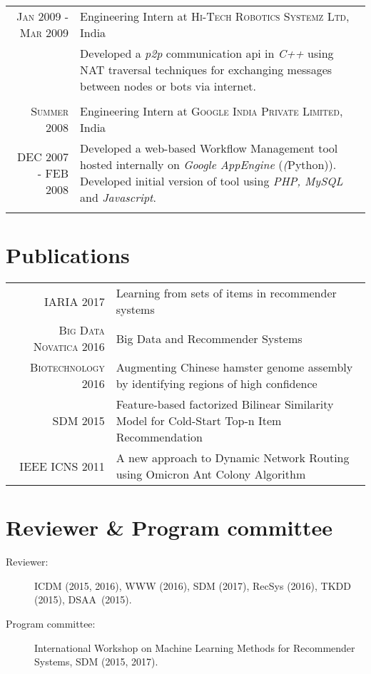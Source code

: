 \documentclass[a4paper,10pt]{article}
\begin{document}
\begin{tabular}{r|p{11cm}}
  \textsc{Jan 2009 - Mar 2009} & Engineering Intern at \textsc{Hi-Tech Robotics
                 Systemz Ltd}, India \\
                 &\footnotesize{ Developed a \emph{p2p} communication api in
                 \emph{C++}
                 using NAT traversal techniques for exchanging messages between
               nodes or bots via internet.} \\\multicolumn{2}{c}{} \\

  \textsc{Summer 2008} & Engineering Intern at \textsc{Google India Private
             Limited}, India \\
             DEC 2007 - FEB 2008  &\footnotesize{ Developed a web-based Workflow Management
           tool hosted internally on \emph{Google AppEngine} (\emph(Python)).
       Developed initial version of tool using \emph{PHP, MySQL} and \emph{
     Javascript}.} \\\multicolumn{2}{c}{} \\
  
\end{tabular}

\section{Publications}
\begin{tabular}{rp{11cm}}
  \textsc{IARIA} 2017 & Learning from sets of items in recommender systems \\
  \textsc{Big Data Novatica} 2016 & Big Data and Recommender Systems \\
  \textsc{Biotechnology} 2016 & Augmenting Chinese hamster genome
  assembly by identifying regions of high confidence \\
 \textsc{SDM} 2015 & Feature-based factorized Bilinear Similarity Model for
  Cold-Start Top-n Item Recommendation
  \\
 \textsc{IEEE ICNS} 2011 & A new approach to Dynamic Network Routing using Omicron
  Ant Colony Algorithm\\
\end{tabular}

\section{Reviewer \& Program committee}
\begin{description}
  \item[Reviewer: ] ICDM (2015, 2016), WWW (2016), SDM (2017), RecSys (2016),
    TKDD (2015), DSAA~(2015).
  \item[Program committee: ] International Workshop on Machine Learning Methods
    for Recommender Systems, SDM (2015, 2017).
\end{description}
\end{document}
